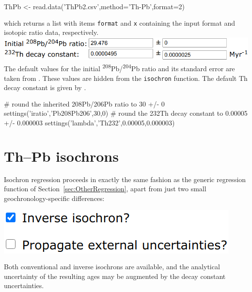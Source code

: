 \begin{refsection}
\begin{script}
ThPb <- read.data('ThPb2.csv',method='Th-Pb',format=2)
\end{script}

\noindent which returns a list with items \texttt{format} and
\texttt{x} containing the input format and isotopic ratio data,
respectively.\\

\noindent\includegraphics[width=.7\linewidth]{../figures/ThPbLambda.png}\\
\noindent The default values for the initial
\textsuperscript{208}Pb/\textsuperscript{204}Pb ratio and its standard
error are taken from \citet{stacey1975}. These values are hidden from
the \texttt{isochron} function. The default Th decay constant is given
by \citet{leroux1963}.

\begin{script}
# round the inherited 208Pb/206Pb ratio to 30 +/- 0
settings('iratio','Pb208Pb206',30,0) 
# round the 232Th decay constant to 0.00005 +/- 0.000003
settings('lambda','Th232',0.00005,0.000003) 
\end{script}

\section{Th--Pb isochrons}\label{sec:ThPb-isochrons-R}

Isochron regression proceeds in exactly the same fashion as the
generic regression function of Section~\ref{sec:OtherRegression},
apart from just two small geochronology-specific differences:\\

\noindent\begin{minipage}[t]{.35\linewidth}
\strut\vspace*{-\baselineskip}\newline
\includegraphics[width=\linewidth]{../figures/ThPbInverseExterr.png}
\end{minipage}
\begin{minipage}[t]{.65\linewidth}
Both conventional and inverse isochrons are available, and the
analytical uncertainty of the resulting ages may be augmented by the
decay constant uncertainties.\\
\end{minipage}


\end{refsection}

